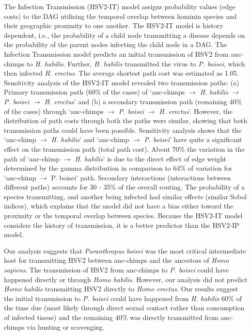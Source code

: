 \documentclass[fleqn,10pt]{wlscirep}
\begin{document}
The Infection Transmission (HSV2-IT) model assigns probability values (edge costs) to the DAG utilising the temporal overlap between hominin species and their geographic proximity to one another. The HSV2-IT model is history dependent, i.e., the probability of a child node transmitting a disease depends on the probability of the parent nodes infecting the child node in a DAG. The Infection Transmission model predicts an initial transmission of HSV2 from anc-chimps to \textit{H. habilis}. Further, \textit{H. habilis} transmitted the virus to \textit{P. boisei}, which then infected \textit{H. erectus}. The average shortest path cost was estimated as 1.05. Sensitivity analysis of the HSV2-IT model revealed two transmission paths: (a) Primary transmission path (60\% of the cases) of `anc-chimps $\rightarrow$ \textit{H. habilis} $\rightarrow$ \textit{P. boisei} $\rightarrow$ \textit{H. erectus}' and (b) a secondary transmission path (remaining 40\% of the cases) through `anc-chimps $\rightarrow$ \textit{P. boisei} $\rightarrow$ \textit{H. erectus}'. However, the distribution of path costs through both the paths were similar, showing that both transmission paths could have been possible. Sensitivity analysis shows that the `anc-chimp $\rightarrow$ \textit{H. habilis}' and `anc-chimp $\rightarrow$ \textit{P. boisei}' have quite a significant effect on the transmission path (total path cost). About 70\% the variation in the path of `anc-chimp $\rightarrow$ \textit{H. habilis}' is due to the direct effect of edge weight determined by the gamma distribution in comparison to 64\% of variation for  `anc-chimp $\rightarrow$ P. boisei' path. Secondary interactions (interactions between different paths) accounts for 30 - 35\% of the overall routing. The probability of a species transmitting, and another being infected had similar effects (similar Sobol indices), which explains that the model did not have a bias either toward the proximity or the temporal overlap between species. Because the HSV2-IT model considers the history of transmission, it is a better predictor than the HSV2-IP model.

Our analysis suggests that \textit{Paranthropus boisei} was the most critical intermediate host for transmitting HSV2 between anc-chimps and the ancestors of \textit{Homo sapiens}. The transmission of HSV2 from anc-chimps to \textit{P. boisei} could have happened directly or through \textit{Homo habilis}. However, our analysis did not predict \textit{Homo habilis} transmitting HSV2 directly to \textit{Homo erectus}. Our results suggest the initial transmission to \textit{P. boisei} could have happened from \textit{H. habilis} 60\% of the time due (most likely through direct sexual contact rather than consumption of infected tissue) and the remaining 40\% was directly transmitted from anc-chimps via hunting or scavenging.
\end{document}
